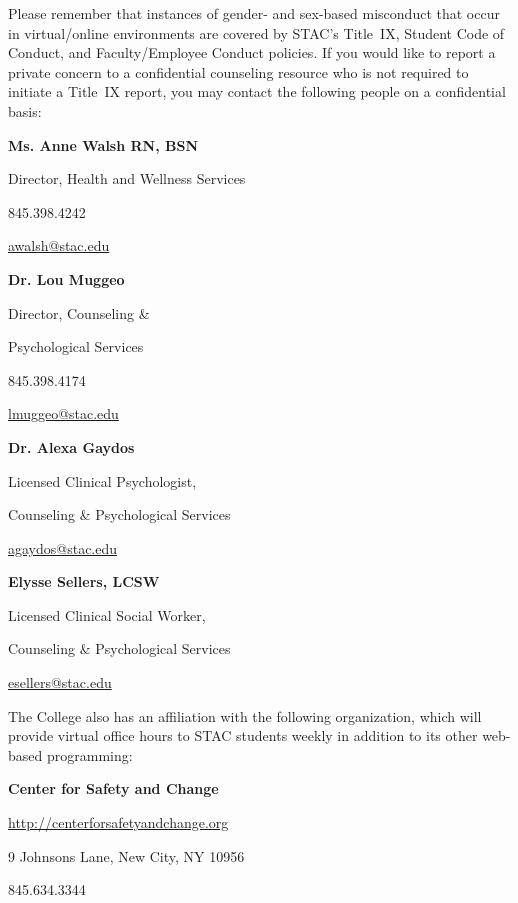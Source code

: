 \documentclass[11pt,letterpaper]{article}
\begin{document}
Please remember that instances of gender- and sex-based misconduct that occur in virtual/online environments are covered by STAC’s Title~IX, Student Code of Conduct, and Faculty/Employee Conduct policies. If you would like to report a private concern to a confidential counseling resource who is not required to initiate a Title~IX report, you may contact the following people on a confidential basis: \pspace

	\hfill\begin{minipage}[t]{0.49\textwidth}
	{\bfseries Ms. Anne Walsh RN, BSN} \par
	Director, Health and Wellness Services \par
	845.398.4242 \par
	\href{mailto:awalsh@stac.edu}{awalsh@stac.edu}
	\end{minipage}\begin{minipage}[t]{0.49\textwidth}
	{\bfseries Dr. Lou Muggeo} \par
	Director, Counseling \& \par
	Psychological Services \par
	845.398.4174 \par
	\href{mailto:lmuggeo@stac.edu}{lmuggeo@stac.edu}
        \end{minipage} \pspace
        \hfill\begin{minipage}[t]{0.49\textwidth} 
 	{\bfseries Dr. Alexa Gaydos} \par
	Licensed Clinical Psychologist, \par
	Counseling \& Psychological Services \par
	\href{mailto:agaydos@stac.edu}{agaydos@stac.edu}
	\end{minipage}\begin{minipage}[t]{0.49\textwidth} 
	{\bfseries Elysse Sellers, LCSW} \par
	Licensed Clinical Social Worker, \par
	Counseling \& Psychological Services \par
	\href{mailto:esellers@stac.edu}{esellers@stac.edu}
        \end{minipage} \pspace
 
The College also has an affiliation with the following organization, which will provide virtual office hours to STAC students weekly in addition to its other web-based programming: \pspace
 
        \hspace{0.3cm} {\bfseries Center for Safety and Change} \par
        \hspace{0.3cm} \url{http://centerforsafetyandchange.org} \par
        \hspace{0.3cm} 9 Johnsons Lane, New City, NY 10956 \par
        \hspace{0.3cm} 845.634.3344
\sectionbreak
\end{document}
